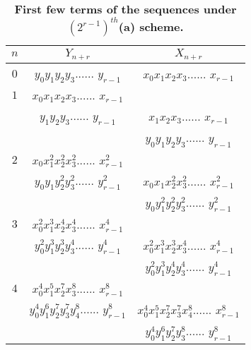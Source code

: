 \begin{table}[H]
\begin{center}
\begin{tabular}{ccc}
  \hline
 $ n  $& $Y_{n+r} $ &  $X_{n+r}$\\
  \hline
  $0 $ &  $y_{0} y_{1} y_{2} y_{3} $......  $y_{r-1} $ & $ x_{0} x_{1} x_{2} x_{3} $...... $ x_{r-1} $\\
	\hline
  $1 $ &  $x_{0} x_{1} x_{2} x_{3} $...... $ x_{r-1}$\\&$ y_{1} y_{2} y_{3} $...... $ y_{r-1} $ & $ x_{1} x_{2} x_{3} $...... $x_{r-1}$\\&&$ y_{0} y_{1}y_{2}y_{3} $...... $ y_{r-1} $\\
	\hline
  $2  $& $ x_{0} x_{1}^2 x_{2}^2 x_{3}^2 $...... $ x_{r-1}^2 $\\&$y_{0} y_{1} y_{2}^2 y_{3}^2 $...... $y_{r-1}^2 $ &  $x_{0} x_{1} x_{2}^2 x_{3}^2 $...... $x_{r-1}^2$\\&&$ y_{0} y_{1}^2 y_{2}^2y_{3}^2 $...... $y_{r-1}^2$ \\
	\hline
  $3 $ & $x_{0}^2 x_{1}^3 x_{2}^4 x_{3}^4 $...... $ x_{r-1}^4$\\&$ y_{0}^2 y_{1}^3 y_{2}^3 y_{3}^4 $...... $ y_{r-1}^4 $ &  $x_{0}^2 x_{1}^3 x_{2}^3 x_{3}^4 $...... $x_{r-1}^4 $\\&&$y_{0}^2 y_{1}^3 y_{2}^4 y_{3}^4 $...... $y_{r-1}^4$\\
	\hline
  $4 $ &  $x_{0}^4 x_{1}^5 x_{2}^7 x_{3}^8 $...... $ x_{r-1}^8 $\\&$y_{0}^4 y_{1}^6 y_{2}^7 y_{3}^7 y_{4}^8 $...... $ y_{r-1}^8  $&  $x_{0}^4 x_{1}^5 x_{2}^7 x_{3}^7 x_{4}^8 $...... $ x_{r-1}^8 $\\&&$y_{0}^4 y_{1}^6y_{2}^7 y_{3}^8 $...... $y_{r-1}^8$ \\
  \hline
\end{tabular}
\caption{\textbf{First few terms of the sequences under $(2^{r-1})^{th}$(a) scheme.}}
\label{t2} 
\end{center}
\end{table}
